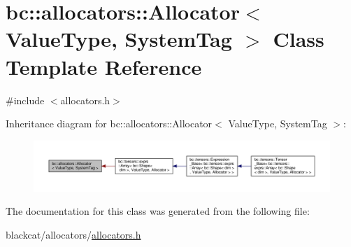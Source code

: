 \hypertarget{classbc_1_1allocators_1_1Allocator}{}\section{bc\+:\+:allocators\+:\+:Allocator$<$ Value\+Type, System\+Tag $>$ Class Template Reference}
\label{classbc_1_1allocators_1_1Allocator}


{\ttfamily \#include $<$allocators.\+h$>$}



Inheritance diagram for bc\+:\+:allocators\+:\+:Allocator$<$ Value\+Type, System\+Tag $>$\+:\nopagebreak
\begin{figure}[H]
\begin{center}
\leavevmode
\includegraphics[width=350pt]{classbc_1_1allocators_1_1Allocator__inherit__graph}
\end{center}
\end{figure}


The documentation for this class was generated from the following file\+:\begin{DoxyCompactItemize}
\item 
blackcat/allocators/\hyperlink{allocators_8h}{allocators.\+h}\end{DoxyCompactItemize}
